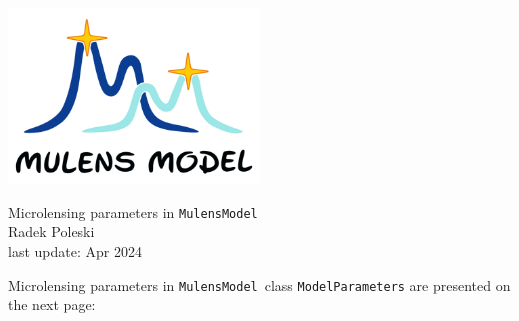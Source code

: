 \documentclass[12pt]{article}
\newcommand\MM{{\tt MulensModel}}
\begin{document}

\begin{center}
\includegraphics[width=0.5\textwidth]{logo/logoMM_crop_4_744x520.png}
\end{center}

\vspace*{3cm}

\begin{center}
{\LARGE Microlensing parameters in \MM}\\
\bigskip
Radek Poleski\\
last update: Apr 2024
\end{center}

\bigskip
Microlensing parameters in \MM\, class {\tt ModelParameters} are presented on the next page:
\end{document}
